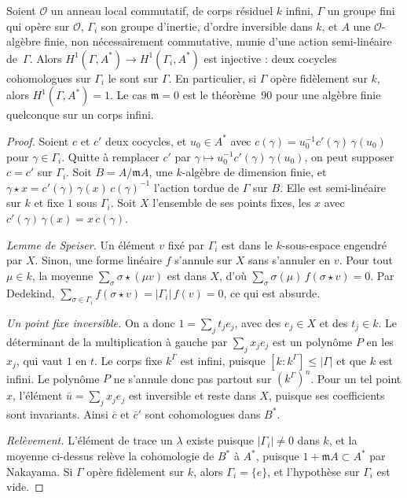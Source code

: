 \begin{encadre}
\begin{enonce}
Soient $\mathcal O$ un anneau local commutatif, de corps résiduel $k$ infini, $\Gamma$ un groupe fini qui opère sur $\mathcal O$, $\Gamma_i$ son groupe d'inertie, d'ordre inversible dans $k$, et $A$ une $\mathcal O$-algèbre finie, non nécessairement commutative, munie d'une action semi-linéaire de~$\Gamma$. Alors $H^1(\Gamma, A^*) \to H^1(\Gamma_i, A^*)$ est injective : deux cocycles cohomologues sur $\Gamma_i$ le sont sur $\Gamma$. En particulier, si $\Gamma$ opère fidèlement sur $k$, alors $H^1(\Gamma, A^*) = 1$. Le cas $\mathfrak m = 0$ est le théorème~90 pour une algèbre finie quelconque sur un corps infini.
\end{enonce}
\end{encadre}

\begin{proof}
Soient $c$ et $c'$ deux cocycles, et $u_0 \in A^*$ avec $c(\gamma) = u_0^{-1}c'(\gamma)\,\gamma(u_0)$ pour $\gamma \in \Gamma_i$. Quitte à remplacer $c'$ par $\gamma \mapsto u_0^{-1}c'(\gamma)\,\gamma(u_0)$, on peut supposer $c = c'$ sur $\Gamma_i$. Soit $B = A/\mathfrak mA$, une $k$-algèbre de dimension finie, et $\gamma \star x = c'(\gamma)\,\gamma(x)\,c(\gamma)^{-1}$ l'action tordue de $\Gamma$ sur $B$. Elle est semi-linéaire sur $k$ et fixe $1$ sous $\Gamma_i$. Soit $X$ l'ensemble de ses points fixes, les $x$ avec $c'(\gamma)\,\gamma(x) = x\,c(\gamma)$.

\emph{Lemme de Speiser.} Un élément $v$ fixé par $\Gamma_i$ est dans le $k$-sous-espace engendré par $X$. Sinon, une forme linéaire $f$ s'annule sur $X$ sans s'annuler en $v$. Pour tout $\mu \in k$, la moyenne $\sum_\sigma \sigma \star (\mu v)$ est dans $X$, d'où $\sum_\sigma \sigma(\mu)\,f(\sigma \star v) = 0$. Par Dedekind, $\sum_{\sigma \in \Gamma_i} f(\sigma \star v) = |\Gamma_i|\,f(v) = 0$, ce qui est absurde.

\emph{Un point fixe inversible.} On a donc $1 = \sum_j t_j e_j$, avec des $e_j \in X$ et des $t_j \in k$. Le déterminant de la multiplication à gauche par $\sum_j x_j e_j$ est un polynôme $P$ en les $x_j$, qui vaut $1$ en $t$. Le corps fixe $k^\Gamma$ est infini, puisque $[k : k^\Gamma] \leq |\Gamma|$ et que $k$ est infini. Le polynôme $P$ ne s'annule donc pas partout sur $(k^\Gamma)^n$. Pour un tel point $x$, l'élément $\bar u = \sum_j x_j e_j$ est inversible et reste dans $X$, puisque ses coefficients sont invariants. Ainsi $\bar c$ et $\bar c'$ sont cohomologues dans $B^*$.

\emph{Relèvement.} L'élément de trace un $\lambda$ existe puisque $|\Gamma_i| \neq 0$ dans $k$, et la moyenne ci-dessus relève la cohomologie de $B^*$ à $A^*$, puisque $1 + \mathfrak mA \subset A^*$ par Nakayama. Si $\Gamma$ opère fidèlement sur $k$, alors $\Gamma_i = \{e\}$, et l'hypothèse sur $\Gamma_i$ est vide.
\end{proof}

